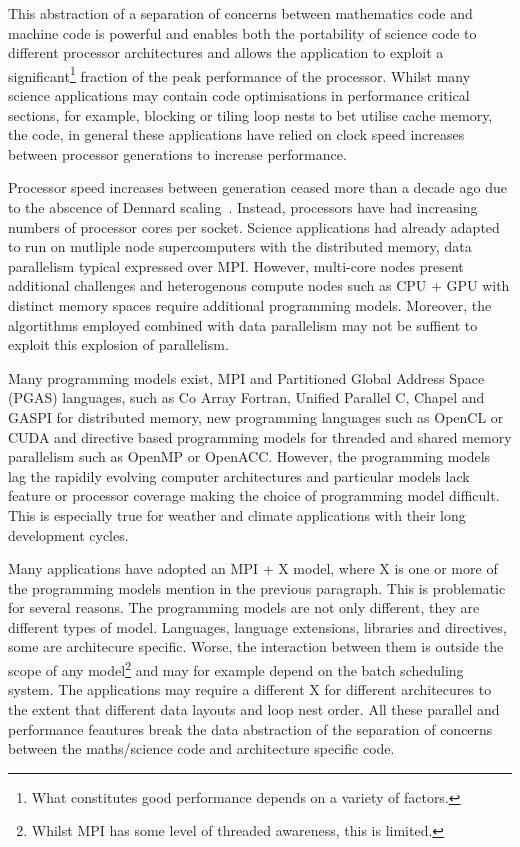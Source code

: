 \documentclass[times]{elsarticle}
\begin{document}
This abstraction of a separation of concerns between mathematics code
and machine code is powerful and enables both the portability of
science code to different processor architectures and allows the
application to exploit a significant\footnote{What constitutes good
  performance depends on a variety of factors.} fraction of the peak
performance of the processor. Whilst many science applications may
contain code optimisations in performance critical sections, for
example, blocking or tiling loop nests to bet utilise cache memory,
the code, in general these applications have relied on clock
speed increases between processor generations to increase performance.

Processor speed increases between generation ceased more than a decade
ago due to the abscence of Dennard scaling~\cite{dennard}. Instead,
processors have had increasing numbers of processor cores per
socket. Science applications had already adapted to run on mutliple
node supercomputers with the distributed memory, data parallelism
typical expressed over MPI. However, multi-core nodes present
additional challenges and heterogenous compute nodes such as
CPU + GPU with distinct memory spaces require additional programming
models. Moreover, the algortithms employed combined with data
parallelism may not be suffient to exploit this explosion of parallelism.

Many programming models exist, MPI and Partitioned Global Address
Space (PGAS) languages, such as Co Array Fortran, Unified Parallel C,
Chapel and GASPI for distributed memory, new programming languages such
as OpenCL or CUDA and directive based programming models for threaded
and shared memory parallelism such as OpenMP or OpenACC. However,
the programming models lag the rapidily evolving computer
architectures and particular models lack feature or processor coverage
making the choice of programming model difficult. This is especially
true for weather and climate applications with their long development
cycles. 

Many applications have adopted an MPI + X model, where X is one
or more of the programming models mention in the previous
paragraph. This is problematic for several reasons. The programming
models are not only different, they are different types of
model. Languages, language extensions, libraries and directives, some
are architecure specific. Worse, the interaction between them is
outside the scope of any model\footnote{Whilst MPI has some level of
  threaded awareness, this is limited.} and may for example depend on
the batch scheduling system. The applications may require a different
X for different architecures to the extent that different data layouts
and loop nest order. All these parallel and performance feautures
break the data abstraction of the separation of concerns between the
maths/science code and architecture specific code. 
\end{document}
